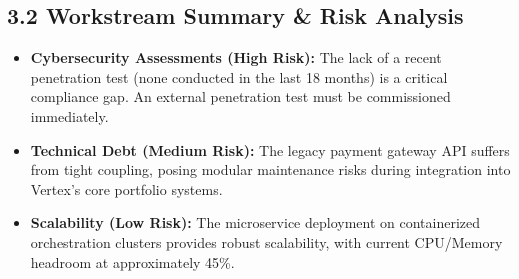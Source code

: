 \subsection{3.2 Workstream Summary \& Risk Analysis}
\begin{itemize}[leftmargin=*]
  \item \textbf{Cybersecurity Assessments (High Risk):} The lack of a recent penetration test (none conducted in the last 18 months) is a critical compliance gap. An external penetration test must be commissioned immediately.
  \item \textbf{Technical Debt (Medium Risk):} The legacy payment gateway API suffers from tight coupling, posing modular maintenance risks during integration into Vertex's core portfolio systems.
  \item \textbf{Scalability (Low Risk):} The microservice deployment on containerized orchestration clusters provides robust scalability, with current CPU/Memory headroom at approximately 45\%.
\end{itemize}
